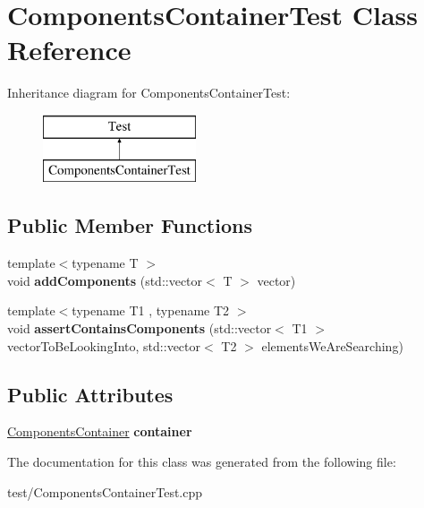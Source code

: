 \hypertarget{classComponentsContainerTest}{}\section{Components\+Container\+Test Class Reference}
\label{classComponentsContainerTest}
Inheritance diagram for Components\+Container\+Test\+:\begin{figure}[H]
\begin{center}
\leavevmode
\includegraphics[height=2.000000cm]{classComponentsContainerTest}
\end{center}
\end{figure}
\subsection*{Public Member Functions}
\begin{DoxyCompactItemize}
\item 
{\footnotesize template$<$typename T $>$ }\\void {\bfseries add\+Components} (std\+::vector$<$ T $>$ vector)\hypertarget{classComponentsContainerTest_a93cb48e1a34f76c17a42f332e09c1ce1}{}\label{classComponentsContainerTest_a93cb48e1a34f76c17a42f332e09c1ce1}

\item 
{\footnotesize template$<$typename T1 , typename T2 $>$ }\\void {\bfseries assert\+Contains\+Components} (std\+::vector$<$ T1 $>$ vector\+To\+Be\+Looking\+Into, std\+::vector$<$ T2 $>$ elements\+We\+Are\+Searching)\hypertarget{classComponentsContainerTest_a50cef55afdfa4ead49156f6b2936c15c}{}\label{classComponentsContainerTest_a50cef55afdfa4ead49156f6b2936c15c}

\end{DoxyCompactItemize}
\subsection*{Public Attributes}
\begin{DoxyCompactItemize}
\item 
\hyperlink{classComponentsContainer}{Components\+Container} {\bfseries container}\hypertarget{classComponentsContainerTest_a28409e522854cb2dc8960c6a95251f78}{}\label{classComponentsContainerTest_a28409e522854cb2dc8960c6a95251f78}

\end{DoxyCompactItemize}


The documentation for this class was generated from the following file\+:\begin{DoxyCompactItemize}
\item 
test/Components\+Container\+Test.\+cpp\end{DoxyCompactItemize}
